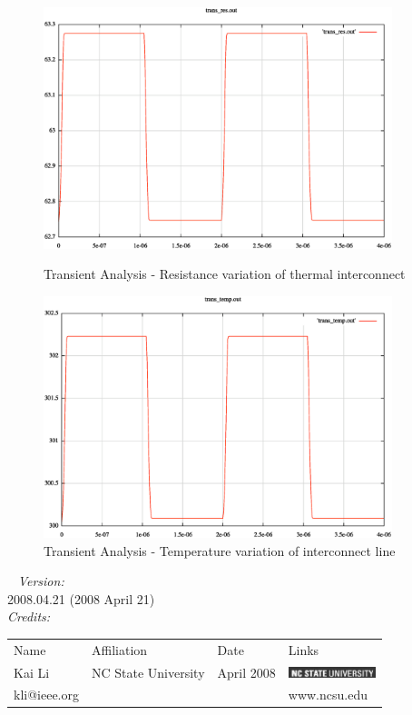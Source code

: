 \documentclass{article}
\begin{document}
\begin{figure}[h]
\centerline{\includegraphics[width=4in]{trans_res.eps}}\caption{Transient Analysis - Resistance variation of thermal interconnect}
\centerline{\includegraphics[width=4in]{trans_temp.eps}}\caption{Transient Analysis - Temperature variation of interconnect line}
\end{figure}
\clearpage
~
\myThickLine
\textit{Version:}\\
2008.04.21 (2008 April 21) \\
\myThickLine
\medskip
\textit{Credits:}\\
\begin{tabular}{l  l  l  l}
Name & Affiliation & Date & Links \\
Kai Li & NC State University & April 2008 & \includegraphics[width=1in]{logo.eps}  \\
kli@ieee.org & & & www.ncsu.edu    \\
\end{tabular}
\end{document}
